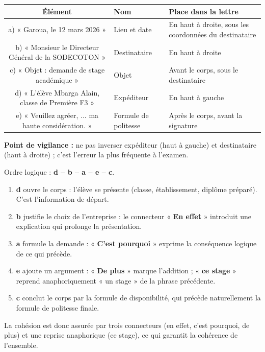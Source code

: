 \documentclass[11pt]{article}
\newcounter{popsec}
\newcounter{popsub}
\newcommand{\courssub}[1]{%
  \stepcounter{popsub}%
  \par\vspace{9pt}\noindent{\popxbold\fontsize{11.5}{13}\selectfont\color{popink}{\color{poporange}\thepopsec.\thepopsub}\hspace{6pt}#1}\par\nopagebreak\vspace{4pt}
}
\begin{document}
\begin{corrige}
\begin{center}
\begin{tabularx}{\linewidth}{|c|X|X|}
\hline
\rowcolor{popblueL} Élément & Nom & Place dans la lettre \\
\hline
a) « Garoua, le 12 mars 2026 » & Lieu et date & En haut à droite, sous les coordonnées du destinataire \\
\hline
b) « Monsieur le Directeur Général de la SODECOTON » & Destinataire & En haut à droite \\
\hline
c) « Objet : demande de stage académique » & Objet & Avant le corps, sous le destinataire \\
\hline
d) « L'élève Mbarga Alain, classe de Première F3 » & Expéditeur & En haut à gauche \\
\hline
e) « Veuillez agréer, ... ma haute considération. » & Formule de politesse & Après le corps, avant la signature \\
\hline
\end{tabularx}
\end{center}
\textbf{Point de vigilance :} ne pas inverser expéditeur (haut à gauche) et destinataire (haut à droite) ; c'est l'erreur la plus fréquente à l'examen.
\end{corrige}

\courssub{Corrigés de « Je m'entraîne »}

\begin{corrige}
Ordre logique : \textbf{d -- b -- a -- e -- c}.
\begin{enumerate}
\item \textbf{d} ouvre le corps : l'élève se présente (classe, établissement, diplôme préparé). C'est l'information de départ.
\item \textbf{b} justifie le choix de l'entreprise : le connecteur « \textbf{En effet} » introduit une explication qui prolonge la présentation.
\item \textbf{a} formule la demande : « \textbf{C'est pourquoi} » exprime la conséquence logique de ce qui précède.
\item \textbf{e} ajoute un argument : « \textbf{De plus} » marque l'addition ; « \textbf{ce stage} » reprend anaphoriquement « un stage » de la phrase précédente.
\item \textbf{c} conclut le corps par la formule de disponibilité, qui précède naturellement la formule de politesse finale.
\end{enumerate}
La cohésion est donc assurée par trois connecteurs (en effet, c'est pourquoi, de plus) et une reprise anaphorique (ce stage), ce qui garantit la cohérence de l'ensemble.
\end{corrige}
\end{document}
